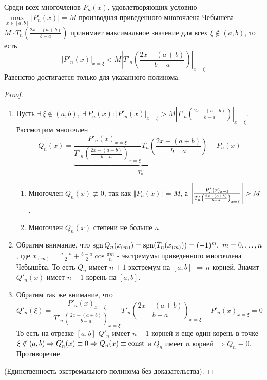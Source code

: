 \begin{theorem}[Марков А.А]
  Среди всех многочленов $P_n(x)$, удовлетворяющих условию $\max\limits_{x\in[a,b]}|P_n(x)|=M$
  производная приведенного многочлена Чебышёва $M\cdot T_n\left(\frac{2x-(a+b)}{b-a}\right)$ принимает максимальное значение
  для всех $\xi\notin(a,b)$, то есть
  \[|P'_n(x)|_{x=\xi}<M\left|T'_n\left(\frac{2x-(a+b)}{b-a}\right)\right|_{x=\xi}\]
  Равенство достигается только для указанного полинома.
\end{theorem}
\begin{proof}
  \begin{enumerate}
    \item Пусть $\exists\ \xi\notin(a,b),\ \exists\ P_n(x): |P'_n(x)|_{x=\xi}>M\left|T'_n\left(\frac{2x-(a+b)}{b-a}\right)\right|_{x=\xi}$. Рассмотрим многочлен
          \[Q_n(x)=\underbrace{\frac{P'_n(x)_{x=\xi}}{T'_n\left(\frac{2x-(a+b)}{b-a}\right)_{x=\xi}}T_n\left(\frac{2x-(a+b)}{b-a}\right)}_{\tilde{T}_n} - P_n(x)\]
          \begin{enumerate}
            \item Многочлен $Q_n(x)\not\equiv0$, так как $\Vert P_n(x)\Vert=M$, а $\left\lvert\frac{P'_n(x)_{x=\xi}}{T'_n\left(\frac{2x-(a+b)}{b-a}\right)_{x=\xi}}\right\rvert>M$.
            \item Многочлен $Q_n(x)$ степени не больше $n$.
          \end{enumerate}
    \item Обратим внимание, что $\operatorname{sgn} Q_n(x_{(m)})=\operatorname{sgn}(\tilde{T}_n(x_{(m)}))=(-1)^m,\ m=0,\ldots,n$, где $x_{(m)}=\frac{a+b}{2}+\frac{b-a}{2}\cos\frac{\pi m}{n}$
          - экстремумы приведенного многочлена Чебышёва. То есть $Q_n$ имеет $n+1$ экстремум на $[a,b]$ $\Rightarrow n$ корней. Значит $Q'_n(x)$ имеет $n-1$ корень на $[a,b]$.
    \item Обратим так же внимание, что
          \[Q'_n(\xi)=\frac{P'_n(x)_{x=\xi}}{T'_n\left(\frac{2x-(a+b)}{b-a}\right)_{x=\xi}}T'_n\left(\frac{2x-(a+b)}{b-a}\right)_{x=\xi} - P'_n(x)_{x=\xi}= 0\]
          То есть на отрезке $[a,b]$
          $Q'_n$ имеет $n-1$ корней и еще один корень
          в точке $\xi\notin(a,b)\Rightarrow Q'_n(x)\equiv0\Rightarrow Q_n(x)\equiv\mathrm{const}$ и $Q_n$ имеет $n$ корней $\Rightarrow Q_n\equiv0$. Противоречие.
  \end{enumerate}
  (Единственность экстремального полинома без доказательства).
\end{proof}

